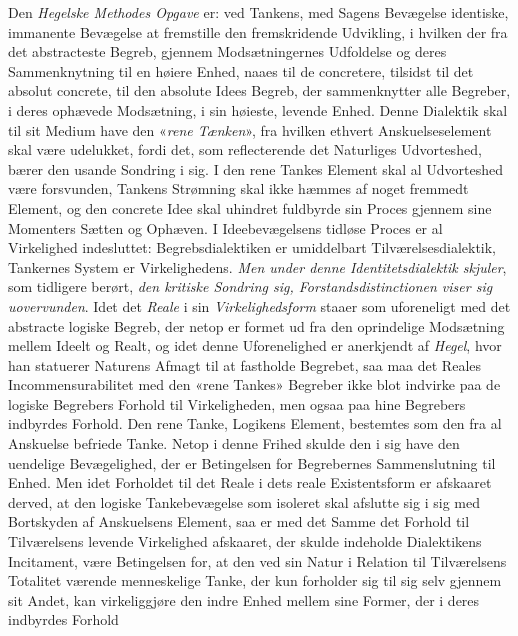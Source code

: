 Den \emph{Hegelske Methodes Opgave} er: ved Tankens,
med Sagens Bevægelse identiske, immanente Bevægelse at
fremstille den fremskridende Udvikling, i hvilken der fra det
abstracteste Begreb, gjennem Modsætningernes Udfoldelse og
deres Sammenknytning til en høiere Enhed, naaes til de concretere,
tilsidst til det absolut concrete, til den absolute Idees
Begreb, der sammenknytter alle Begreber, i deres ophævede
Modsætning, i sin høieste, levende Enhed. Denne Dialektik
skal til sit Medium have den «\emph{rene Tænken}», fra hvilken
ethvert Anskuelseselement skal være udelukket, fordi det, som
reflecterende det Naturliges Udvorteshed, bærer den usande
Sondring i sig. I den rene Tankes Element skal al Udvorteshed
være forsvunden, Tankens Strømning skal ikke hæmmes
af noget fremmedt Element, og den concrete Idee skal uhindret
fuldbyrde sin Proces gjennem sine Momenters Sætten og
Ophæven. I Ideebevægelsens tidløse Proces er al Virkelighed
indesluttet: Begrebsdialektiken er umiddelbart Tilværelsesdialektik,
Tankernes System er Virkelighedens.
 \emph{Men under denne Identitetsdialektik skjuler},
som tidligere berørt, \emph{den kritiske Sondring sig, Forstandsdistinctionen
viser sig uovervunden}. Idet det
\emph{Reale} i sin \emph{Virkelighedsform} staaer som uforeneligt med
det abstracte logiske Begreb, der netop er formet ud fra den
oprindelige Modsætning mellem Ideelt og Realt, og idet denne
Uforenelighed er anerkjendt af \emph{Hegel}, hvor han statuerer
Naturens Afmagt til at fastholde Begrebet, saa maa det Reales
Incommensurabilitet med den «rene Tankes» Begreber ikke
blot indvirke paa de logiske Begrebers Forhold til Virkeligheden,
men ogsaa paa hine Begrebers indbyrdes Forhold. Den
rene Tanke, Logikens Element, bestemtes som den fra al Anskuelse
befriede Tanke. Netop i denne Frihed skulde den i
sig have den uendelige Bevægelighed, der er Betingelsen for
Begrebernes Sammenslutning til Enhed. Men idet Forholdet
til det Reale i dets reale Existentsform er afskaaret derved,
at den logiske Tankebevægelse som isoleret skal afslutte sig i
sig med Bortskyden af Anskuelsens Element, saa er med det
Samme det Forhold til Tilværelsens levende Virkelighed afskaaret,
der skulde indeholde Dialektikens Incitament, være
Betingelsen for, at den ved sin Natur i Relation til Tilværelsens
Totalitet værende menneskelige Tanke, der kun forholder
sig til sig selv gjennem sit Andet, kan virkeliggjøre den indre
Enhed mellem sine Former, der i deres indbyrdes Forhold
